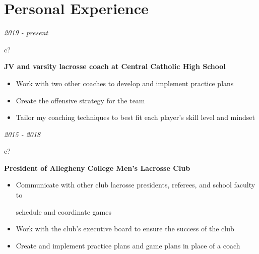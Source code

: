 \documentclass[12pt,a4paper,sans]{moderncv} %
\begin{document}
\vspace{-9 mm}
\section{Personal Experience}

 \textit{2019 - present}
\hspace{-1.7 mm}
\begin{tabular}{c?} \\
\end{tabular}
 \hspace{2 mm}
 \textbf{JV and varsity lacrosse coach at Central Catholic High School} 
 \vspace{0 mm}
 \begin{itemize}
 \addtolength{\itemindent}{31.7 mm}
 \item{Work with two other coaches to develop and implement practice plans}
 \item{Create the offensive strategy for the team}
 \item{Tailor my coaching techniques to best fit each player's skill level and mindset}
 
 \end{itemize}
 
 
\textit{2015 - 2018}
\hspace{2 mm}
\begin{tabular}{c?}
 \\
\end{tabular}
 \hspace{2 mm}
 \textbf{President of Allegheny College Men's Lacrosse Club} 
 \vspace{0 mm}
 \begin{itemize}
 \addtolength{\itemindent}{31.7 mm}
 \item{Communicate with other club lacrosse presidents, referees, and school faculty to 
 
 \hspace{32 mm}schedule and coordinate games}
 
 
 \item{Work with the club's executive board to ensure the success of the club }
 \item{Create and implement practice plans and game plans in place of a coach}
 \end{itemize}
 
\end{document}
